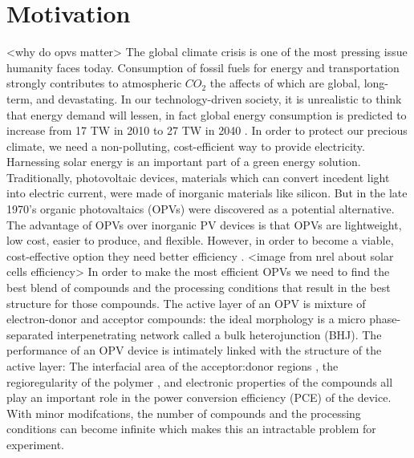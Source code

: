 \section*{Motivation}
<why do opvs matter>
The global climate crisis is one of the most pressing issue humanity faces today.
Consumption of fossil fuels for energy and transportation strongly contributes to atmospheric $CO_2$ the affects of which are global, long-term, and devastating\cite{Solomon2009a}.
In our technology-driven society, it is unrealistic to think that energy demand will lessen, in fact global energy consumption is predicted to increase from 17 TW in 2010 to 27 TW in 2040 \cite{Mazzio2015}.
In order to protect our precious climate, we need a non-polluting, cost-efficient way to provide electricity. %
Harnessing solar energy is an important part of a green energy solution. %
Traditionally, photovoltaic devices, materials which can convert incedent light into electric current, were made of inorganic materials like silicon.
But in the late 1970's organic photovaltaics (OPVs) were discovered as a potential alternative. %
The advantage of OPVs over inorganic PV devices is that OPVs are lightweight, low cost, easier to produce, and flexible. 
However, in order to become a viable, cost-effective option they need better efficiency \cite{Mazzio2015}.
<image from nrel about solar cells efficiency>\cite{https://www.nrel.gov/pv/cell-efficiency.html}
In order to make the most efficient OPVs we need to find the best blend of compounds and the processing conditions that result in the best structure for those compounds.
The active layer of an OPV is mixture of electron-donor and acceptor compounds: the ideal morphology is a micro phase-separated interpenetrating network called a bulk heterojunction (BHJ).
The performance of an OPV device is intimately linked with the structure of the active layer:
The interfacial area of the acceptor:donor regions \cite{Mazzio2015}, the regioregularity of the polymer \cite{Kim2006}, and electronic properties of the compounds \cite{Scharber2006a} all play an important role in the power conversion efficiency (PCE) of the device. %
With minor modifcations, the number of compounds and the processing conditions can become infinite which makes this an intractable problem for experiment. %
